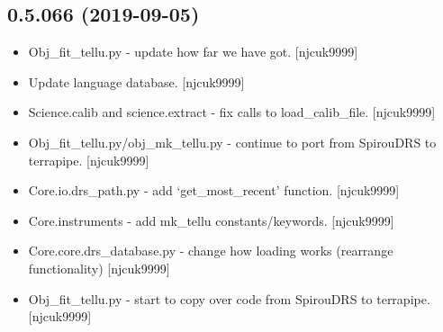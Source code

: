 \documentclass[a4paper,10pt,english]{report}
\begin{document}
\subsection{0.5.066 (2019-09-05)}
\label{\detokenize{misc/changelog:id75}}\begin{itemize}
\item {} 
Obj\_fit\_tellu.py - update how far we have got. {[}njcuk9999{]}

\item {} 
Update language database. {[}njcuk9999{]}

\item {} 
Science.calib and science.extract - fix calls to load\_calib\_file.
{[}njcuk9999{]}

\item {} 
Obj\_fit\_tellu.py/obj\_mk\_tellu.py - continue to port from SpirouDRS to
terrapipe. {[}njcuk9999{]}

\item {} 
Core.io.drs\_path.py - add ‘get\_most\_recent’ function. {[}njcuk9999{]}

\item {} 
Core.instruments - add mk\_tellu constants/keywords. {[}njcuk9999{]}

\item {} 
Core.core.drs\_database.py - change how loading works (rearrange
functionality) {[}njcuk9999{]}

\item {} 
Obj\_fit\_tellu.py - start to copy over code from SpirouDRS to
terrapipe. {[}njcuk9999{]}

\end{itemize}
\end{document}
